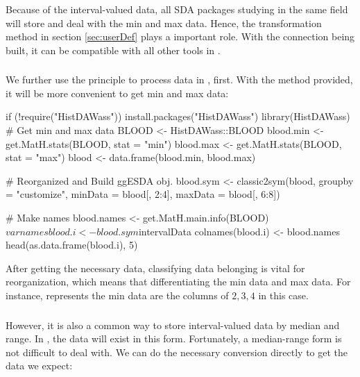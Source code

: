 \documentclass[article]{jss}
\begin{document}
Because of the interval-valued data, all SDA packages studying in the same field will store and deal with the min and max data. Hence, the transformation method in section \ref{sec:userDef} plays a important role. With the connection being built, it can be compatible with all other tools in .


\subsubsection[HistDAWass]{}

We further use the principle to process  data in , first. With the method  provided, it will be more convenient to get min and max data:

\begin{CodeChunk}
\begin{CodeInput}
if (!require("HistDAWass")) install.packages("HistDAWass")
library(HistDAWass)
# Get min and max data
BLOOD <- HistDAWass::BLOOD
blood.min <- get.MatH.stats(BLOOD, stat = "min")
blood.max <- get.MatH.stats(BLOOD, stat = "max")
blood <- data.frame(blood.min, blood.max)

# Reorganized and Build ggESDA obj.
blood.sym <- classic2sym(blood, groupby = "customize",
                     minData = blood[, 2:4],
                     maxData = blood[, 6:8])

# Make names
blood.names <- get.MatH.main.info(BLOOD)$varnames
blood.i <- blood.sym$intervalData
colnames(blood.i) <- blood.names
head(as.data.frame(blood.i), 5)
\end{CodeInput}
\end{CodeChunk}

After getting the necessary data, classifying data belonging is vital for reorganization, which means that differentiating the min data and max data. For instance,  represents the min data are the columns of $2,3,4$ in this case.



\subsubsection[MAINT.Data]{}

However, it is also a common way to store interval-valued data by median and range. In , the data will exist in this form. Fortunately, a median-range form is not difficult to deal with. We can do the necessary conversion directly to get the data we expect:
\end{document}
